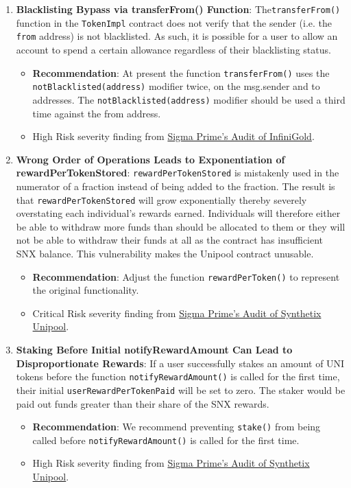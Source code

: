 \begin{enumerate}
\item\textbf{Blacklisting Bypass via transferFrom() Function}: The\linebreak\verb|transferFrom()| function in the \verb|TokenImpl| contract does not verify that the sender (i.e. the \verb|from| address) is not blacklisted. As such, it is possible for a user to allow an account to spend a certain allowance regardless of their blacklisting status.
	\begin{itemize}
	\item\textbf{Recommendation}: At present the function \verb|transferFrom()| uses the \verb|notBlacklisted(address)| modifier twice, on the msg.sender and to addresses. The \verb|notBlacklisted(address)| modifier should be used a third time against the from address.
	\item High Risk severity finding from \href{https://github.com/sigp/public-audits/raw/master/infinigold/review.pdf}{Sigma Prime's Audit of InfiniGold}.
	\end{itemize}

\item\textbf{Wrong Order of Operations Leads to Exponentiation of rewardPerTokenStored}: \verb|rewardPerTokenStored| is mistakenly used in the numerator of a fraction instead of being added to the fraction. The result is that \verb|rewardPerTokenStored| will grow exponentially thereby severely overstating each individual's rewards earned. Individuals will therefore either be able to withdraw more funds than should be allocated to them or they will not be able to withdraw their funds at all as the contract has insufficient SNX balance. This vulnerability makes the Unipool contract unusable.
	\begin{itemize}
	\item\textbf{Recommendation}: Adjust the function \verb|rewardPerToken()| to represent the original functionality.
	\item Critical Risk severity finding from \href{https://github.com/sigp/public-audits/blob/master/synthetix/unipool/review.pdf}{Sigma Prime's Audit of Synthetix Unipool}.
	\end{itemize}

\item\textbf{Staking Before Initial notifyRewardAmount Can Lead to Disproportionate Rewards}: If a user successfully stakes an amount of UNI tokens before the function \verb|notifyRewardAmount()| is called for the first time, their initial \verb|userRewardPerTokenPaid| will be set to zero. The staker would be paid out funds greater than their share of the SNX rewards.
	\begin{itemize}
	\item\textbf{Recommendation}: We recommend preventing \verb|stake()| from being called before \verb|notifyRewardAmount()| is called for the first time.
	\item High Risk severity finding from \href{https://github.com/sigp/public-audits/blob/master/synthetix/unipool/review.pdf}{Sigma Prime's Audit of Synthetix Unipool}.
	\end{itemize}


\end{enumerate}
